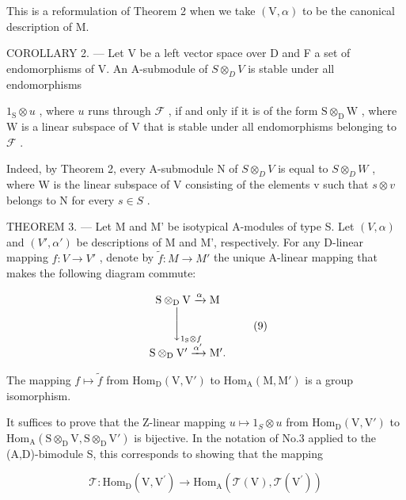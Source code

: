 This is a reformulation of Theorem 2 when we take \((\mathrm{V},\alpha)\) to be the canonical description of M.

COROLLARY 2. --- Let V be a left vector space over D and F a set of endomorphisms of V. An A-submodule of \(S \otimes_{D} V\) is stable under all endomorphisms

\(1_{\mathrm{S}} \otimes u\) , where \(u\) runs through \(\mathcal{F}\) , if and only if it is of the form \(\mathrm{S} \otimes_{\mathrm{D}} \mathrm{W}\) , where \(\mathrm{W}\) is a linear subspace of \(\mathrm{V}\) that is stable under all endomorphisms belonging to \(\mathcal{F}\) .

Indeed, by Theorem 2, every A-submodule N of \(S \otimes_{D} V\) is equal to \(S \otimes_{D} W\) , where W is the linear subspace of V consisting of the elements v such that \(s \otimes v\) belongs to N for every \(s \in S\) .

THEOREM 3. --- Let M and M' be isotypical A-modules of type S. Let \((V, \alpha)\) and \((V', \alpha')\) be descriptions of M and M', respectively. For any D-linear mapping \(f : V \to V'\) , denote by \(\widetilde{f} : M \to M'\) the unique A-linear mapping that makes the following diagram commute:

\[
\begin{array}{c} \mathrm{S} \otimes_ {\mathrm{D}} \mathrm{V} \xrightarrow {\alpha} \mathrm{M} \\ \Biggl \downarrow_ {1 _ {\mathrm{S}} \otimes f} \\ \mathrm{S} \otimes_ {\mathrm{D}} \mathrm{V} ^ {\prime} \xrightarrow {\alpha^ {\prime}} \mathrm{M} ^ {\prime}. \end{array}\tag{9}
\]

The mapping \(f \mapsto \widetilde{f}\) from \(\mathrm{Hom}_{\mathrm{D}}(\mathrm{V},\mathrm{V}')\) to \(\mathrm{Hom}_{\mathrm{A}}(\mathrm{M},\mathrm{M}')\) is a group isomorphism.

It suffices to prove that the Z-linear mapping \(u \mapsto 1_{S} \otimes u\) from \(\mathrm{Hom}_{\mathrm{D}}(\mathrm{V}, \mathrm{V}')\) to \(\mathrm{Hom}_{\mathrm{A}}(\mathrm{S} \otimes_{\mathrm{D}} \mathrm{V}, \mathrm{S} \otimes_{\mathrm{D}} \mathrm{V}')\) is bijective. In the notation of No.3 applied to the (A,D)-bimodule S, this corresponds to showing that the mapping

\[
\mathcal {T}: \mathrm{Hom} _ {\mathrm{D}} (\mathrm{V}, \mathrm{V} ^ {\prime}) \longrightarrow \mathrm{Hom} _ {\mathrm{A}} (\mathcal {T} (\mathrm{V}), \mathcal {T} (\mathrm{V} ^ {\prime}))
\]

